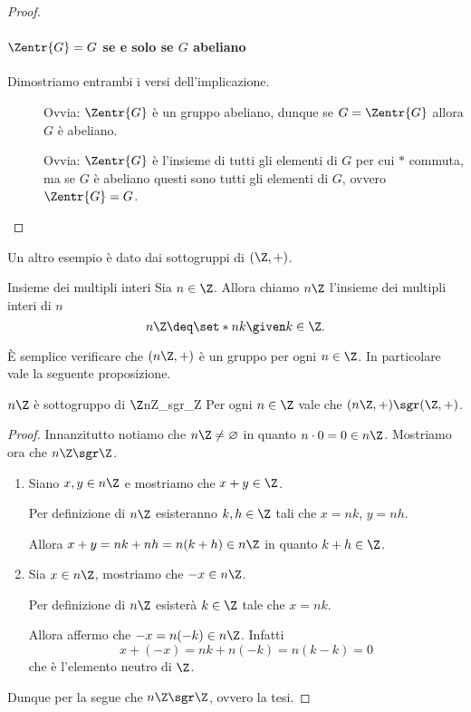 \begin{proof}
    \paragraph{$\Zentr{G} = G$ se e solo se $G$ abeliano} Dimostriamo entrambi i versi dell'implicazione.
    \begin{description}
        \item[\boximpl ] Ovvia: $\Zentr{G}$ è un gruppo abeliano, dunque se $G = \Zentr{G}$ allora $G$ è abeliano.
        \item[\boximplby]  Ovvia: $\Zentr{G}$ è l'insieme di tutti gli elementi di $G$ per cui $\ast $ commuta, ma se $G$ è abeliano questi sono tutti gli elementi di $G$, ovvero $\Zentr{G} = G$.  \qedhere
    \end{description}
\end{proof}

Un altro esempio è dato dai sottogruppi di $(\Z, +)$.

\begin{definition}
    {Insieme dei multipli interi}{}
    Sia $n \in \Z$. Allora chiamo $n\Z$ l'insieme dei multipli interi di $n$ \[
         n\Z \deq \set*{nk \given k \in \Z}.
    \]
\end{definition}

È semplice verificare che $(n\Z, +)$ è un gruppo per ogni $n \in \Z$. In particolare vale la seguente proposizione.

\begin{proposition}
    {$n\Z$ è sottogruppo di $\Z$}{nZ_sgr_Z}
    Per ogni $n \in \Z$ vale che $(n\Z, +) \sgr (\Z, +)$.
\end{proposition}
\begin{proof}
    Innanzitutto notiamo che $n\Z \neq \varnothing$ in quanto $n \cdot 0 = 0 \in n\Z$.     
    Mostriamo ora che $n\Z \sgr \Z$.
    \begin{enumerate}[label={(\arabic*)}]
        \item Siano $x, y \in n\Z$ e mostriamo che $x+y \in \Z$. 
        
        Per definizione di $n\Z$ esisteranno $k, h \in \Z$ tali che $x = nk$, $y = nh$.
        
        Allora $x + y = nk + nh = n(k + h) \in n\Z$ in quanto $k + h \in \Z$.
        \item Sia $x \in n\Z$, mostriamo che $-x \in n\Z$.
        
        Per definizione di $n\Z$ esisterà $k \in \Z$ tale che $x = nk$.

        Allora affermo che $-x = n(-k) \in n\Z$. Infatti \[
            x + (-x) = nk + n(-k) = n(k - k) = 0    
        \] che è l'elemento neutro di $\Z$.
    \end{enumerate}

    Dunque per la  segue che $n\Z \sgr \Z$, ovvero la tesi.
\end{proof}

